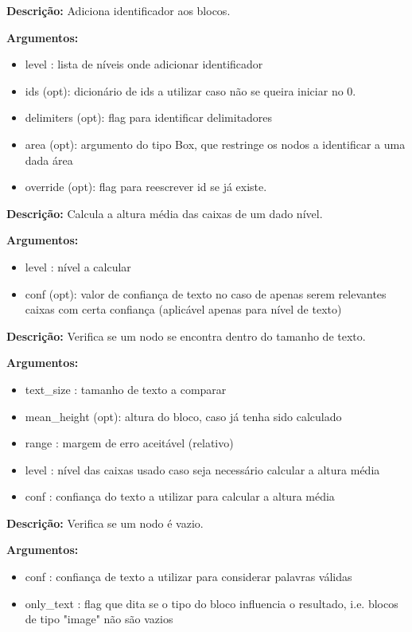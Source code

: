  
\textbf{Descrição:} Adiciona identificador aos blocos.
	
\textbf{Argumentos:}
	\begin{itemize}\setlength\itemsep{-0.3em}
		\item level : lista de níveis onde adicionar identificador
		\item ids (opt): dicionário de ids a utilizar caso não se queira iniciar no 0.
		\item delimiters (opt): flag para identificar delimitadores
		\item area (opt): argumento do tipo Box, que restringe os nodos a identificar a uma dada área
		\item override (opt): flag para reescrever id se já existe.
	\end{itemize}
				

\textbf{Descrição:} Calcula a altura média das caixas de um dado nível.
	
\textbf{Argumentos:}
\begin{itemize}\setlength\itemsep{-0.3em}
	\item level : nível a calcular
	\item conf (opt): valor de confiança de texto no caso de apenas serem relevantes caixas com certa confiança (aplicável apenas para nível de texto)
\end{itemize}

	

\textbf{Descrição:} Verifica se um nodo se encontra dentro do tamanho de texto.
	
\textbf{Argumentos:}
\begin{itemize}\setlength\itemsep{-0.3em}
	\item text\_size : tamanho de texto a comparar
	\item mean\_height (opt): altura do bloco, caso já tenha sido calculado
	\item range : margem de erro aceitável (relativo)
	\item level : nível das caixas usado caso seja necessário calcular a altura média
	\item conf : confiança do texto a utilizar para calcular a altura média
\end{itemize}


\textbf{Descrição:} Verifica se um nodo é vazio.
	
\textbf{Argumentos:}
\begin{itemize}\setlength\itemsep{-0.3em}
	\item conf : confiança de texto a utilizar para considerar palavras válidas
	\item only\_text : flag que dita se o tipo do bloco influencia o resultado, i.e. blocos de tipo "image" não são vazios
\end{itemize}


